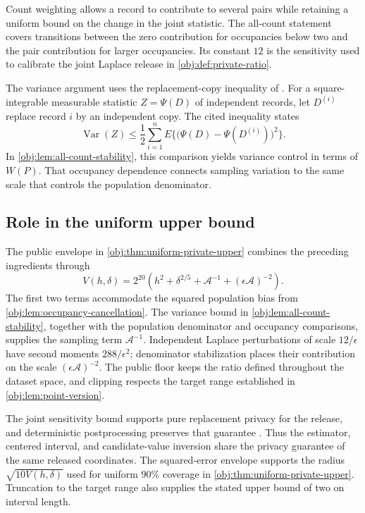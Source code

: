 Count weighting allows a record to contribute to several pairs while retaining a uniform bound on the change in the joint statistic. The all-count statement covers transitions between the zero contribution for occupancies below two and the pair contribution for larger occupancies. Its constant \(12\) is the sensitivity used to calibrate the joint Laplace release in \cref{obj:def:private-ratio}.

The variance argument uses the replacement-copy inequality of \citet[Theorem 3.1, replacement-copy form, p.~54]{BoucheronLugosiMassart2013}. For a square-integrable measurable statistic \(Z=\Psi(D)\) of independent records, let \(D^{(i)}\) replace record \(i\) by an independent copy. The cited inequality states
\[
\operatorname{Var}(Z)
\le
\frac12\sum_{i=1}^n
E\bigl\{\bigl(\Psi(D)-\Psi(D^{(i)})\bigr)^2\bigr\}.
\]
In \cref{obj:lem:all-count-stability}, this comparison yields variance control in terms of \(W(P)\). That occupancy dependence connects sampling variation to the same scale that controls the population denominator.

\subsection{Role in the uniform upper bound}

The public envelope in \cref{obj:thm:uniform-private-upper} combines the preceding ingredients through
\[
V(h,\delta)
=
2^{20}\left(
h^2+\delta^{2/5}
+\mathcal A^{-1}
+(\epsilon\mathcal A)^{-2}
\right).
\]
The first two terms accommodate the squared population bias from \cref{obj:lem:occupancy-cancellation}. The variance bound in \cref{obj:lem:all-count-stability}, together with the population denominator and occupancy comparisons, supplies the sampling term \(\mathcal A^{-1}\). Independent Laplace perturbations of scale \(12/\epsilon\) have second moments \(288/\epsilon^2\); denominator stabilization places their contribution on the scale \((\epsilon\mathcal A)^{-2}\). The public floor keeps the ratio defined throughout the dataset space, and clipping respects the target range established in \cref{obj:lem:point-version}.

The joint sensitivity bound supports pure replacement privacy for the release, and deterministic postprocessing preserves that guarantee \citep[Theorem 3.6 and Proposition 2.1]{Dwork2014}. Thus the estimator, centered interval, and candidate-value inversion share the privacy guarantee of the same released coordinates. The squared-error envelope supports the radius \(\sqrt{10V(h,\delta)}\) used for uniform \(90\%\) coverage in \cref{obj:thm:uniform-private-upper}. Truncation to the target range also supplies the stated upper bound of two on interval length.

